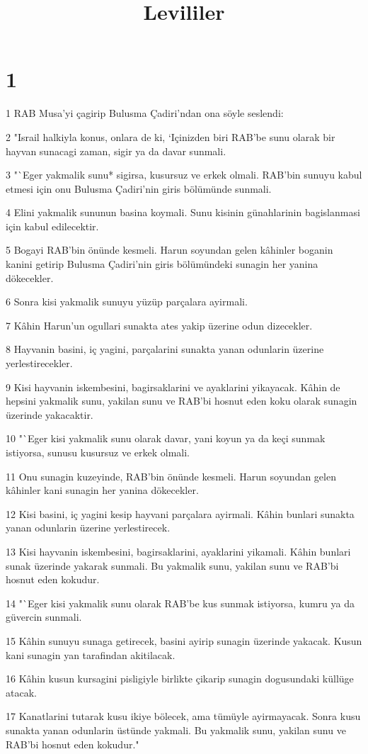 

\title{Levililer}


\chapter{1}

\par 1 RAB Musa'yi çagirip Bulusma Çadiri'ndan ona söyle seslendi:
\par 2 "Israil halkiyla konus, onlara de ki, `Içinizden biri RAB'be sunu olarak bir hayvan sunacagi zaman, sigir ya da davar sunmali.
\par 3 "`Eger yakmalik sunu* sigirsa, kusursuz ve erkek olmali. RAB'bin sunuyu kabul etmesi için onu Bulusma Çadiri'nin giris bölümünde sunmali.
\par 4 Elini yakmalik sununun basina koymali. Sunu kisinin günahlarinin bagislanmasi için kabul edilecektir.
\par 5 Bogayi RAB'bin önünde kesmeli. Harun soyundan gelen kâhinler boganin kanini getirip Bulusma Çadiri'nin giris bölümündeki sunagin her yanina dökecekler.
\par 6 Sonra kisi yakmalik sunuyu yüzüp parçalara ayirmali.
\par 7 Kâhin Harun'un ogullari sunakta ates yakip üzerine odun dizecekler.
\par 8 Hayvanin basini, iç yagini, parçalarini sunakta yanan odunlarin üzerine yerlestirecekler.
\par 9 Kisi hayvanin iskembesini, bagirsaklarini ve ayaklarini yikayacak. Kâhin de hepsini yakmalik sunu, yakilan sunu ve RAB'bi hosnut eden koku olarak sunagin üzerinde yakacaktir.
\par 10 "`Eger kisi yakmalik sunu olarak davar, yani koyun ya da keçi sunmak istiyorsa, sunusu kusursuz ve erkek olmali.
\par 11 Onu sunagin kuzeyinde, RAB'bin önünde kesmeli. Harun soyundan gelen kâhinler kani sunagin her yanina dökecekler.
\par 12 Kisi basini, iç yagini kesip hayvani parçalara ayirmali. Kâhin bunlari sunakta yanan odunlarin üzerine yerlestirecek.
\par 13 Kisi hayvanin iskembesini, bagirsaklarini, ayaklarini yikamali. Kâhin bunlari sunak üzerinde yakarak sunmali. Bu yakmalik sunu, yakilan sunu ve RAB'bi hosnut eden kokudur.
\par 14 "`Eger kisi yakmalik sunu olarak RAB'be kus sunmak istiyorsa, kumru ya da güvercin sunmali.
\par 15 Kâhin sunuyu sunaga getirecek, basini ayirip sunagin üzerinde yakacak. Kusun kani sunagin yan tarafindan akitilacak.
\par 16 Kâhin kusun kursagini pisligiyle birlikte çikarip sunagin dogusundaki küllüge atacak.
\par 17 Kanatlarini tutarak kusu ikiye bölecek, ama tümüyle ayirmayacak. Sonra kusu sunakta yanan odunlarin üstünde yakmali. Bu yakmalik sunu, yakilan sunu ve RAB'bi hosnut eden kokudur."

